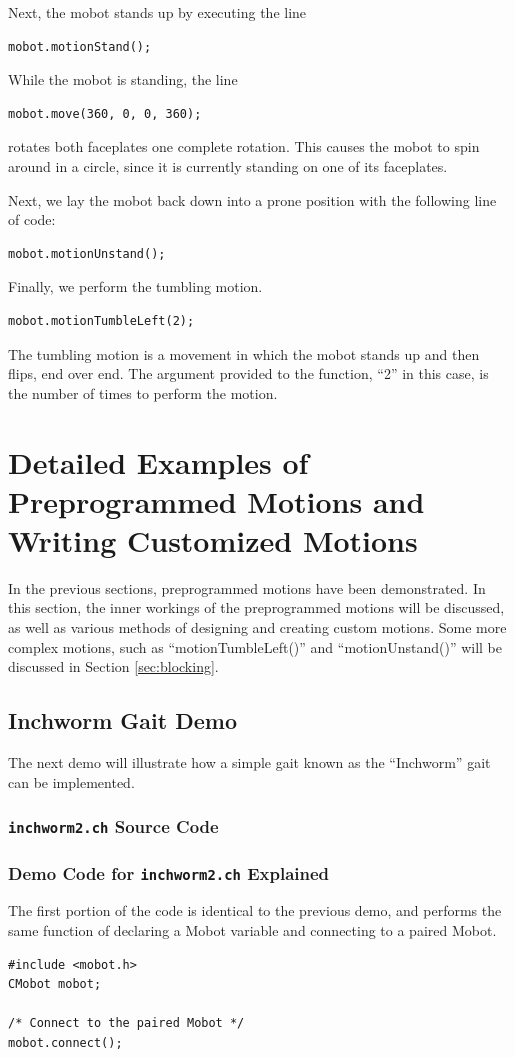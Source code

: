 \documentclass{article}
\begin{document}
Next, the mobot stands up by executing the line
\begin{verbatim}
mobot.motionStand();
\end{verbatim}

While the mobot is standing, the line
\begin{verbatim}
mobot.move(360, 0, 0, 360);
\end{verbatim}
rotates both faceplates one complete rotation. This causes the mobot to spin around 
in a circle, since it is currently standing on one of its faceplates.

Next, we lay the mobot back down into a prone position with the following line
of code:
\begin{verbatim}
mobot.motionUnstand();
\end{verbatim}

Finally, we perform the tumbling motion. 
\begin{verbatim}
mobot.motionTumbleLeft(2);
\end{verbatim}
The tumbling motion is a movement in which
the mobot stands up and then flips, end over end. The argument provided to the
function, ``2'' in this case, is the number of times to perform the motion.

\section{Detailed Examples of Preprogrammed Motions and Writing Customized Motions}
In the previous sections, preprogrammed motions have been demonstrated. In this section,
the inner workings of the preprogrammed motions will be discussed, as well as various
methods of designing and creating custom motions. Some more complex motions, such as 
``motionTumbleLeft()'' and ``motionUnstand()'' will be discussed in Section \ref{sec:blocking}.
\subsection{Inchworm Gait Demo}
The next demo will illustrate how a simple gait known as the ``Inchworm'' gait 
can be implemented.

\subsubsection{\texttt{inchworm2.ch} Source Code}


\subsubsection{Demo Code for \texttt{inchworm2.ch} Explained}
The first portion of the code is identical to the previous demo, and performs
the same function of declaring a Mobot variable and connecting to a 
paired Mobot.
\begin{verbatim}
#include <mobot.h>
CMobot mobot;

/* Connect to the paired Mobot */
mobot.connect();
\end{verbatim}
\end{document}

